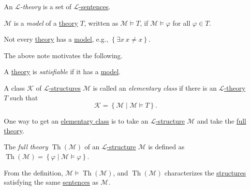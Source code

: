 \begin{definition}[Theory]\label{def:theory}
	An \emph{\(\mathcal{L}\)-theory} is a set of \hyperref[def:sentence]{\(\mathcal{L} \)-sentences}.
\end{definition}

\begin{definition}[Model]\label{def:model}
	\(\mathcal{M} \) is a \emph{model} of a \hyperref[def:theory]{theory} \(T\), written as \(\mathcal{M} \models T\), if \(\mathcal{M} \models \varphi \) for all \(\varphi \in T\).
\end{definition}

\begin{note}
	Not every \hyperref[def:theory]{theory} has a \hyperref[def:model]{model}, e.g., \(\left\{ \exists x\ x \neq x \right\} \).
\end{note}

The above note motivates the following.

\begin{definition}[Satisfiable]\label{def:satisfiable}
	A \hyperref[def:theory]{theory} is \emph{satisfiable} if it has a \hyperref[def:model]{model}.
\end{definition}

\begin{definition}\label{def:elementary-class}
	A class \(\mathcal{K} \) of \hyperref[def:structure]{\(\mathcal{L} \)-structures} \(\mathcal{M} \) is called an \emph{elementary class} if there is an \hyperref[def:theory]{\(\mathcal{L} \)-theory} \(T\) such that
	\[
		\mathcal{K} = \left\{ \mathcal{M} \mid \mathcal{M} \models T \right\}.
	\]
\end{definition}

One way to get an \hyperref[def:elementary-class]{elementary class} is to take an \hyperref[def:structure]{\(\mathcal{L} \)-structure} \(\mathcal{M} \) and take the \hyperref[def:full-theory]{full theory}.

\begin{definition}\label{def:full-theory}
	The \emph{full theory} \(\mathop{\mathrm{Th}}(\mathcal{M} ) \) of an \hyperref[def:structure]{\(\mathcal{L} \)-structure} \(\mathcal{M} \) is defined as \(\mathop{\mathrm{Th}}(\mathcal{M} ) = \left\{ \varphi \mid \mathcal{M} \models \varphi  \right\}\).
\end{definition}

From the definition, \(\mathcal{M} \models \mathop{\mathrm{Th}}(\mathcal{M} ) \), and \(\mathop{\mathrm{Th}}(\mathcal{M} ) \) characterizes the \hyperref[def:structure]{structures} satisfying the same \hyperref[def:sentence]{sentences} as \(\mathcal{M} \).

